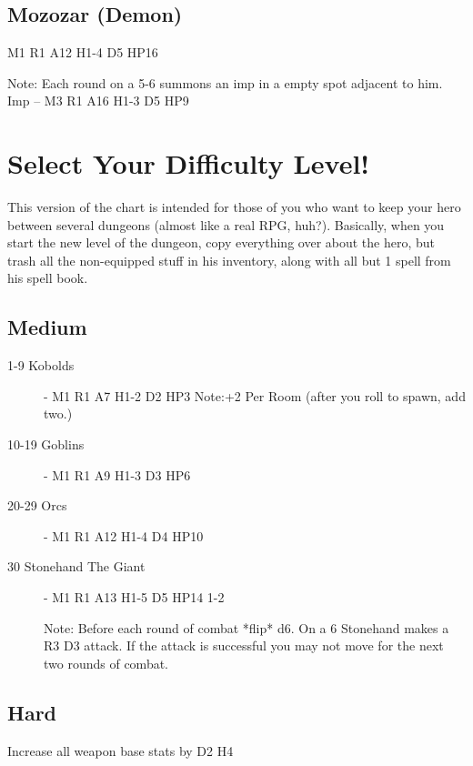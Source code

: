 \documentclass[a6paper,hidelinks]{article}
\begin{document}
\subsection{Mozozar (Demon)}
M1 R1 A12 H1-4 D5 HP16

Note: Each round on a 5-6 summons an imp in a empty spot adjacent to him.
Imp – M3 R1 A16 H1-3 D5 HP9

\section{Select Your Difficulty Level!}

This version of the chart is intended for those of you who want to keep your hero between several dungeons (almost like a real RPG, huh?). Basically, when
you start the new level of the dungeon, copy everything over about the hero, but trash all the non-equipped stuff in his inventory, along with all but 1 spell from his spell book.

\subsection{Medium}

\begin{description}
\item[1-9 Kobolds] - M1 R1 A7 H1-2 D2 HP3 
Note:+2 Per Room (after you roll to spawn, add two.)

\item[10-19 Goblins] - M1 R1 A9 H1-3 D3 HP6

\item[20-29 Orcs] - M1 R1 A12 H1-4 D4 HP10

\item[30 Stonehand The Giant] - M1 R1 A13 H1-5 D5 HP14 1-2

Note: Before each round of combat *flip* d6. On a 6 Stonehand makes a R3 D3 attack. If the attack is successful you may not move for the next two rounds of combat.

\end{description}

\subsection{Hard}

Increase all weapon base stats by D2 H4
\end{document}
